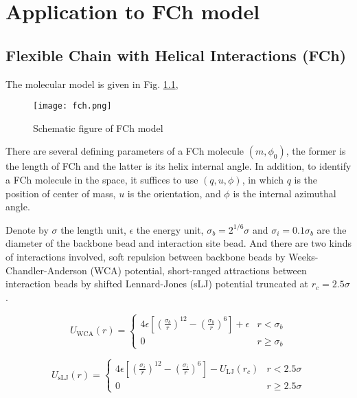 
\chapter{Application to FCh model}\label{chap:model}

\section{Flexible Chain with Helical Interactions (FCh)}
The molecular model is given in Fig. \ref{fig:fch},
\begin{figure}[H]
 	\centering
 	\texttt{[image: fch.png]}
	\caption[Schematic of FCh model]{Schematic figure of FCh model\cite{Liang2019PRE}}
	\label{fig:fch}
\end{figure}

There are several defining parameters of a FCh molecule $(m,\phi_0)$, the former is the length of FCh and the latter is its helix internal angle. In addition, to identify a FCh molecule in the space, it suffices to use $(q,u,\phi)$, in which $q$ is the position of center of mass, $u$ is the orientation, and $\phi$ is the internal azimuthal angle.

Denote by $\sigma$ the length unit, $\epsilon$ the energy unit, $\sigma_b = 2^{1/6}\sigma$ and $\sigma_i = 0.1\sigma_b$ are the diameter of the backbone bead and interaction site bead. And there are two kinds of interactions involved, soft repulsion between backbone beads by Weeks-Chandler-Anderson (WCA) potential, short-ranged attractions between interaction beads by shifted Lennard-Jones (sLJ) potential truncated at $r_c=2.5\sigma$.

\begin{equation}
	U_{\mathrm{WCA}}(r)=\left\{
	\begin{array}{ll}
		4 \epsilon\left[\left(\frac{\sigma_b}{r}\right)^{12}-\left(\frac{\sigma_b}{r}\right)^{6}\right]+\epsilon & r<\sigma_b \\ 0 & r \geq \sigma_b
	\end{array}\right.
\end{equation}

\begin{equation}
	U_{\mathrm{sLJ}}(r)=\left\{
	\begin{array}{ll}
		4 \epsilon\left[\left(\frac{\sigma_i}{r}\right)^{12}-\left(\frac{\sigma_i}{r}\right)^{6}\right]-U_{\mathrm{LJ}}\left(r_c\right) & r<2.5 \sigma\\0 & r \geq 2.5 \sigma
	\end{array}\right.
\end{equation}


